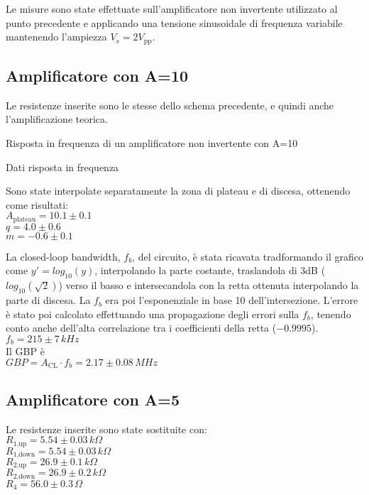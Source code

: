 Le misure sono state effettuate sull'amplificatore non invertente utilizzato al punto precedente e applicando una tensione sinusoidale 
di frequenza variabile mantenendo l'ampiezza $V_s= 2 V_\textrm{pp}$.

\subsection{Amplificatore con A=10}
Le resistenze inserite sono le stesse dello schema precedente, e quindi anche l'amplificazione teorica.

\begin{grafico}
 \centering 
  \resizebox{\textwidth}{!}{%
 
 }%
 \caption{Risposta in frequenza di un amplificatore non invertente con A=10} 
 \label{gr:amp_noninv_A10.tex} 
\end{grafico}

\begin{tabella}
 \centering
  
 \caption{Dati risposta in frequenza}
 \label{tab:tab_noninv_A10.tex}
\end{tabella}

Sono state interpolate separatamente la zona di plateau e di discesa, ottenendo come risultati:\\
$A_\textrm{plateau}=10.1 \pm 0.1 $\\
$q = 4.0 \pm 0.6$\\
$m = -0.6 \pm 0.1$

La closed-loop bandwidth, $f_b$, del circuito, è stata ricavata tradformando il grafico come $y'=log_\textrm{10}(y)$, interpolando la parte costante, 
traslandola di 3dB ($log_\textrm{10}(\sqrt{2})$) verso il basso e intersecandola con la retta ottenuta interpolando la parte di discesa. La $f_b$ era poi l'esponenziale in base 10 dell'intersezione.
L'errore è stato poi calcolato effettuando una propagazione degli errori sulla $f_b$, tenendo conto anche dell'alta correlazione tra i coefficienti della retta ($-0.9995$).\\%
$f_b= 215 \pm 7 \,kHz $\\
Il GBP è\\
$GBP=A_\textrm{CL} \cdot f_b = 2.17 \pm 0.08 \,MHz$\\

\subsection{Amplificatore con A=5}
Le resistenze inserite sono state sostituite con:\\
$R_\textrm{1,up}=5.54 \pm 0.03\,k\Omega $\\ %
$R_\textrm{1,down}=5.54 \pm 0.03\,k\Omega$\\ %
$R_\textrm{2,up}=26.9 \pm 0.1\,k\Omega$\\ %
$R_\textrm{2,down}=26.9 \pm 0.2 \,k\Omega$\\
$R_4=56.0 \pm 0.3\,\Omega$

